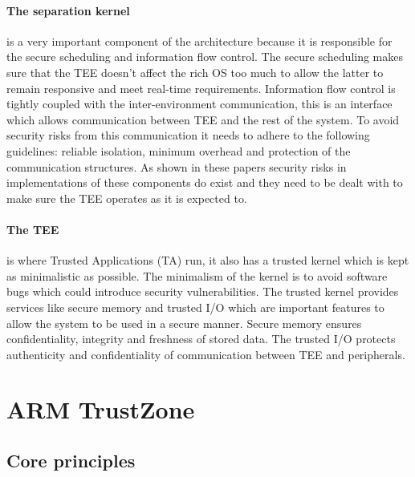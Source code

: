 \paragraph*{The separation kernel}
is a very important component of the architecture because it is responsible for the secure scheduling and information flow control. The secure scheduling makes sure that the TEE doesn't affect the rich OS too much to allow the latter to remain responsive and meet real-time requirements. Information flow control is tightly coupled with the inter-environment communication, this is an interface which allows communication between TEE and the rest of the system. To avoid security risks from this communication it needs to adhere to the following guidelines: reliable isolation, minimum overhead and protection of the communication structures. As shown in these papers \cite{VanBulckJo2019AToT} \cite{GuoPengfei2021RoAT} \cite{KhalidFatima2020HITS} \cite{Machiry2017BOOMERANGET} security risks in implementations of these components do exist and they need to be dealt with to make sure the TEE operates as it is expected to.

\paragraph*{The TEE}
is where Trusted Applications (TA) run, it also has a trusted kernel which is kept as minimalistic as possible. The minimalism of the kernel is to avoid software bugs which could introduce security vulnerabilities. The trusted kernel provides services like secure memory and trusted I/O which are important features to allow the system to be used in a secure manner. Secure memory ensures confidentiality, integrity and freshness of stored data. The trusted I/O protects authenticity and confidentiality of communication between TEE and peripherals.

\section{ARM TrustZone}

\subsection*{Core principles}

